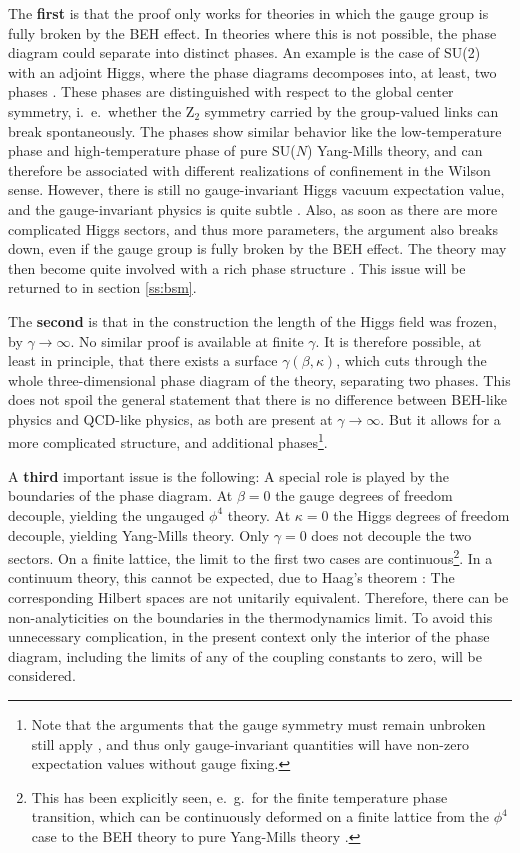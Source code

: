 \documentclass[final,12pt]{article}
\newcommand*{\1}{1\!\!\!\bot}
\begin{document}
The {\bf first} is that the proof only works for theories in which the gauge group is fully broken by the BEH effect. In theories where this is not possible, the phase diagram could separate into distinct phases. An example is the case of SU(2) with an adjoint Higgs, where the phase diagrams decomposes into, at least, two phases \cite{Baier:1986ni}. These phases are distinguished  with respect to the global center symmetry, i.\ e.\ whether the Z$_2$ symmetry carried by the group-valued links can break spontaneously. The phases show similar behavior like the low-temperature phase and high-temperature phase of pure SU($N$) Yang-Mills theory, and can therefore be associated with different realizations of confinement in the Wilson sense. However, there is still no gauge-invariant Higgs vacuum expectation value, and the gauge-invariant physics is quite subtle \cite{Maas:2017xzh,Kondo:2016ywd}. Also, as soon as there are more complicated Higgs sectors, and thus more parameters, the argument also breaks down, even if the gauge group is fully broken by the BEH effect. The theory may then become quite involved with a rich phase structure \cite{Branco:2011iw,Ivanov:2017dad,Lewis:2010ps,Maas:2016qpu,Maas:2014nya}. This issue will be returned to in section \ref{ss:bsm}.

The {\bf second} is that in the construction the length of the Higgs field was frozen, by $\gamma\to\infty$. No similar proof is available at finite $\gamma$. It is therefore possible, at least in principle, that there exists a surface $\gamma(\beta,\kappa)$, which cuts through the whole three-dimensional phase diagram of the theory, separating two phases. This does not spoil the general statement that there is no difference between BEH-like physics and QCD-like physics, as both are present at $\gamma\to\infty$. But it allows for a more complicated structure, and additional phases\footnote{Note that the arguments that the gauge symmetry must remain unbroken still apply \cite{Elitzur:1975im,Haag:1992hx}, and thus only gauge-invariant quantities will have non-zero expectation values without gauge fixing.}.

A {\bf third} important issue is the following: A special role is played by the boundaries of the phase diagram. At $\beta=0$ the gauge degrees of freedom decouple, yielding the ungauged $\phi^4$ theory. At $\kappa=0$ the Higgs degrees of freedom decouple, yielding Yang-Mills theory. Only $\gamma=0$ does not decouple the two sectors. On a finite lattice, the limit to the first two cases are continuous\footnote{This has been explicitly seen, e.\ g.\ for the finite temperature phase transition, which can be continuously deformed on a finite lattice from the $\phi^4$ case to the BEH theory to pure Yang-Mills theory \cite{Wellegehausen:2011sc}.}. In a continuum theory, this cannot be expected, due to Haag's theorem \cite{Haag:1992hx}: The corresponding Hilbert spaces are not unitarily equivalent. Therefore, there can be non-analyticities on the boundaries in the thermodynamics limit. To avoid this unnecessary complication, in the present context only the interior of the phase diagram, including the limits of any of the coupling constants to zero, will be considered.
\end{document}
